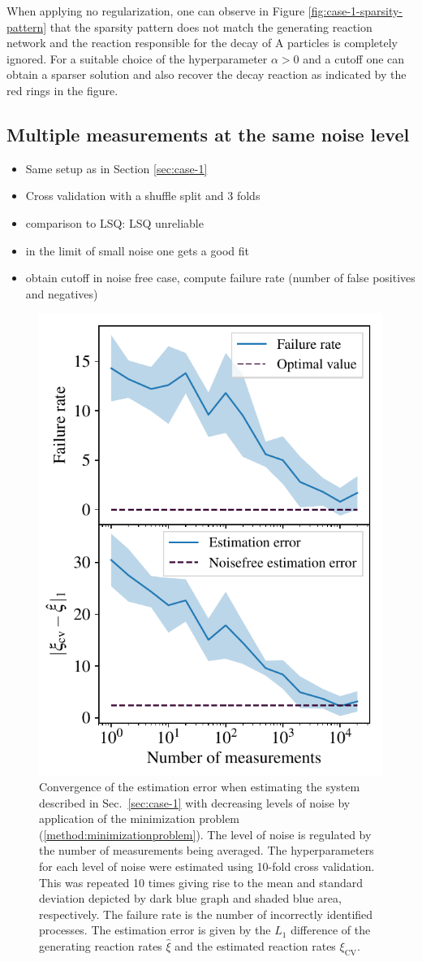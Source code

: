 \documentclass[oneside, abstracton, titlepage]{scrartcl}
\begin{document}
	When applying no regularization, one can observe in Figure \ref{fig:case-1-sparsity-pattern} that the sparsity pattern does not match the generating reaction network and the reaction responsible for the decay of $\mathrm{A}$ particles is completely ignored. For a suitable choice of the hyperparameter $\alpha > 0$ and a cutoff one can obtain a sparser solution and also recover the decay reaction as indicated by the red rings in the figure.
	
	\subsection{Multiple measurements at the same noise level}\label{sec:case-2}
	
	\begin{itemize}
		\item Same setup as in Section \ref{sec:case-1}
		\item Cross validation with a shuffle split and 3 folds
		\item comparison to LSQ: LSQ unreliable
		\item in the limit of small noise one gets a good fit
		\item obtain cutoff in noise free case, compute failure rate (number of false positives and negatives)
	\end{itemize}

	\begin{figure}
		\centering
		\includegraphics[width=.5\columnwidth]{./figures_tex/case2}
		\caption{Convergence of the estimation error when estimating the system described in Sec.~\ref{sec:case-1} with decreasing levels of noise by application of the minimization problem (\ref{method:minimizationproblem}). The level of noise is regulated by the number of measurements being averaged. The hyperparameters for each level of noise were estimated using 10-fold cross validation. This was repeated 10 times giving rise to the mean and standard deviation depicted by dark blue graph and shaded blue area, respectively. The failure rate is the number of incorrectly identified processes. The estimation error is given by the $L_1$ difference of the generating reaction rates $\hat{\xi}$ and the estimated reaction rates $\xi_\mathrm{CV}$.}
		\label{fig:case2-convergence}
	\end{figure}
\end{document}
